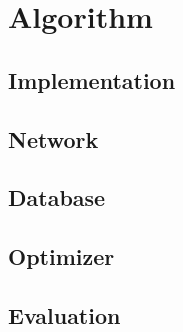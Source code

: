 \section{Algorithm} \label{sec:algorithm}


\newpage

\subsection{Implementation}

\newpage

\subsection{Network} \label{sec:NN}

\newpage

\subsection{Database} \label{sec:DB}

\newpage

\subsection{Optimizer} \label{sec:opt}

\newpage

\subsection{Evaluation} \label{sec:eval}

\newpage
%